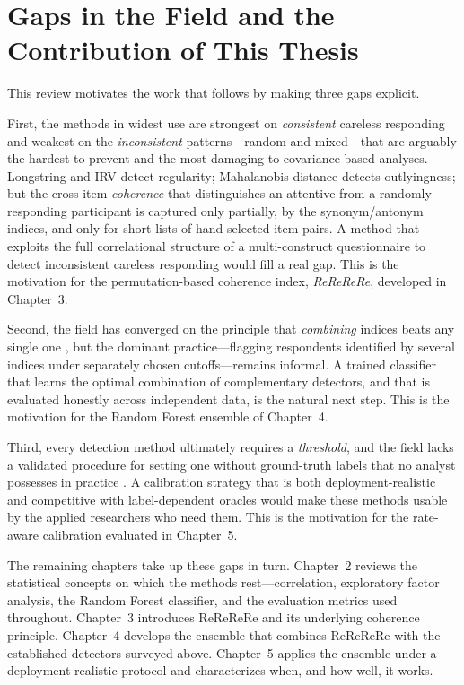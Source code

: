 \section{Gaps in the Field and the Contribution of This Thesis}

This review motivates the work that follows by making three gaps explicit.

First, the methods in widest use are strongest on \emph{consistent} careless
responding and weakest on the \emph{inconsistent} patterns---random and
mixed---that are arguably the hardest to prevent and the most damaging to
covariance-based analyses. Longstring and IRV detect regularity; Mahalanobis
distance detects outlyingness; but the cross-item \emph{coherence} that
distinguishes an attentive from a randomly responding participant is captured
only partially, by the synonym/antonym indices, and only for short lists of
hand-selected item pairs. A method that exploits the full correlational
structure of a multi-construct questionnaire to detect inconsistent careless
responding would fill a real gap. This is the motivation for the
permutation-based coherence index, \emph{ReReReRe}, developed in Chapter~3.

Second, the field has converged on the principle that \emph{combining} indices
beats any single one \parencite{niessen2016detecting, curran2016methods,
schroeders2022detecting}, but the dominant practice---flagging respondents
identified by several indices under separately chosen cutoffs---remains
informal. A trained classifier that learns the optimal combination of
complementary detectors, and that is evaluated honestly across independent
data, is the natural next step. This is the motivation for the Random Forest
ensemble of Chapter~4.

Third, every detection method ultimately requires a \emph{threshold}, and the
field lacks a validated procedure for setting one without ground-truth labels
that no analyst possesses in practice \parencite{ward2023dealing,
alfons2024openscience}. A calibration strategy that is both deployment-realistic
and competitive with label-dependent oracles would make these methods usable by
the applied researchers who need them. This is the motivation for the
rate-aware calibration evaluated in Chapter~5.

The remaining chapters take up these gaps in turn. Chapter~2 reviews the
statistical concepts on which the methods rest---correlation, exploratory factor
analysis, the Random Forest classifier, and the evaluation metrics used
throughout. Chapter~3 introduces ReReReRe and its underlying coherence
principle. Chapter~4 develops the ensemble that combines ReReReRe with the
established detectors surveyed above. Chapter~5 applies the ensemble under a
deployment-realistic protocol and characterizes when, and how well, it works.

